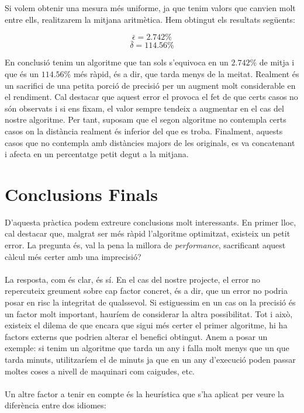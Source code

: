 \documentclass[conference]{IEEEtran}
\begin{document}
    Si volem obtenir una mesura més uniforme, ja que tenim valors que canvien molt entre ells, realitzarem la mitjana aritmètica. Hem obtingut els resultats següents:

    $$\bar{\epsilon}=2.742\%$$
    $$\bar{\delta}=114.56\%$$

    En conclusió tenim un algoritme que tan sols s'equivoca en un $2.742\%$ de mitja i que és un $114.56\%$ més ràpid, és a dir, que tarda menys de la meitat. Realment és un sacrifici de una petita porció de precisió per un augment molt considerable en el rendiment. Cal destacar que aquest error el provoca el fet de que certs casos no són observats i si ens fixam, el valor sempre tendeix a augmentar en el cas del nostre algoritme. Per tant, suposam que el segon algoritme no contempla certs casos on la distància realment és inferior del que es troba. Finalment, aquests casos que no contempla amb distàncies majors de les originals, es va concatenant i afecta en un percentatge petit degut a la mitjana.
    



\section{Conclusions Finals}
    D'aquesta pràctica podem extreure conclusions molt interessants. En primer lloc, cal destacar que, malgrat ser més ràpid l'algoritme optimitzat, existeix un petit error. La pregunta és, val la pena la millora de \textit{performance}, sacrificant aquest càlcul més certer amb una imprecisió?\\\\

    

    La resposta, com és clar, és sí. En el cas del nostre projecte, el error no repercuteix greument sobre cap factor concret, és a dir, que un error no podria posar en risc la integritat de qualssevol. Si estiguessim en un cas on la precisió és un factor molt important, hauríem de considerar la altra possibilitat. Tot i això, existeix el dilema de que encara que sigui més certer el primer algoritme, hi ha factors externs que podrien alterar el benefici obtingut. Anem a posar un exemple: si tenim un algoritme que tarda un any i falla molt menys que un que tarda minuts, utilitzaríem el de minuts ja que en un any d'execució poden passar moltes coses a nivell de maquinari com caigudes, etc.\\\\

    Un altre factor a tenir en compte és la heurística que s'ha aplicat per veure la diferència entre dos idiomes:\\
\end{document}
